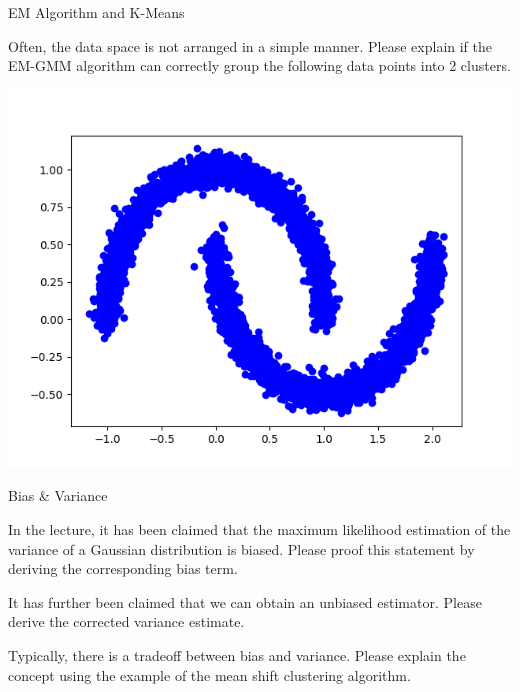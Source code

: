 \documentclass[
	ngerman,
	points=true,%
    solution=true,
    accentcolor=9c,
    colorbacktitle
	]{tudaexercise}
\begin{document}
\begin{task}{EM Algorithm and K-Means}
\begin{subtask}
Often, the data space is not arranged in a simple manner. Please explain if the EM-GMM algorithm can correctly group the following data points into 2 clusters.
\begin{center}
    \includegraphics[scale=0.5]{figures/clustering_moons.png}
\end{center}
\end{subtask}
\begin{solution}
    
\end{solution}
\end{task}

\begin{task}{Bias \& Variance}
\begin{subtask}
In the lecture, it has been claimed that the maximum likelihood estimation of the variance of a Gaussian distribution is biased. Please proof this statement by deriving the corresponding bias term.
\end{subtask}
\begin{solution}
    
\end{solution}

\begin{subtask}
It has further been claimed that we can obtain an unbiased estimator. Please derive the corrected variance estimate.
\end{subtask}

\begin{solution}
    
\end{solution}

\begin{subtask}
Typically, there is a tradeoff between bias and variance. Please explain the concept using the example of the mean shift clustering algorithm. 
\end{subtask}
\begin{solution}
    
\end{solution}

\end{task}
\end{document}
